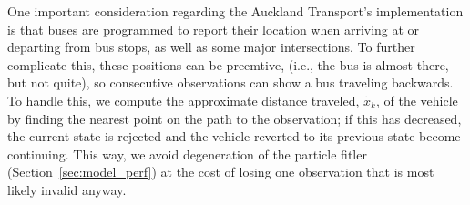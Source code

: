One important consideration regarding the Auckland Transport's \rt implementation is that
buses are programmed to report their location when arriving at or departing from
bus stops, as well as some major intersections.
To further complicate this,
these positions can be preemtive,
(i.e., the bus is almost there, but not quite),
so consecutive observations can show a bus traveling backwards.
To handle this, we compute the approximate distance traveled, $\tilde x_k$,
of the vehicle by finding the nearest point on the path to the observation;
if this has decreased, the current state is rejected and the vehicle reverted
to its previous state become continuing.
This way, we avoid degeneration of the particle fitler (Section~\ref{sec:model_perf})
at the cost of losing one observation that is most likely invalid anyway.


